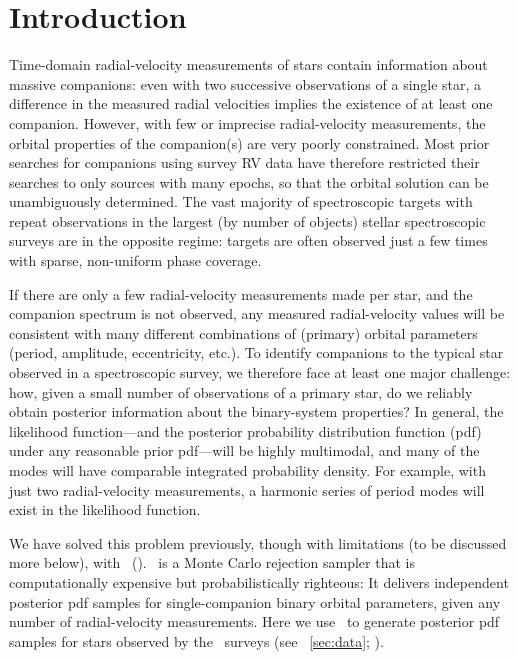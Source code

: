 \documentclass[modern, letterpaper]{aastex61}
\newcommand{\apogee}{\project{\acronym{APOGEE}}}
\newcommand{\thejoker}{\project{The~Joker}}
\begin{document}

\section{Introduction} \label{sec:intro}

Time-domain radial-velocity measurements of stars contain information about
massive companions: even with two successive observations of a single star, a
difference in the measured radial velocities implies the existence of at least
one companion.
However, with few or imprecise radial-velocity measurements, the orbital
properties of the companion(s) are very poorly constrained.
Most prior searches for companions using survey RV data have therefore
restricted their searches to only sources with many epochs, so that the orbital
solution can be unambiguously determined.
The vast majority of spectroscopic targets with repeat observations in the
largest (by number of objects) stellar spectroscopic surveys are in the opposite
regime: targets are often observed just a few times with sparse, non-uniform
phase coverage.


If there are only a few radial-velocity measurements made per star, and the
companion spectrum is not observed, any measured radial-velocity values will be
consistent with many different combinations of (primary) orbital parameters
(period, amplitude, eccentricity, etc.).
To identify companions to the typical star observed in a spectroscopic survey,
we therefore face at least one major challenge: how, given a small number of
observations of a primary star, do we reliably obtain posterior information
about the binary-system properties?
In general, the likelihood function---and the posterior probability distribution
function (pdf) under any reasonable prior pdf---will be highly multimodal, and
many of the modes will have comparable integrated probability density.
For example, with just two radial-velocity measurements, a harmonic series of
period modes will exist in the likelihood function.

We have solved this problem previously, though with limitations (to be discussed
more below), with \thejoker\ (\citealt{Price-Whelan:2017}).
\thejoker\ is a Monte Carlo rejection sampler that is computationally expensive
but probabilistically righteous:
It delivers independent posterior pdf samples for single-companion binary
orbital parameters, given any number of radial-velocity measurements.
Here we use \thejoker\ to generate posterior pdf samples for  stars
observed by the \apogee\ surveys (see \sectionname~\ref{sec:data};
\citealt{Majewski:2015}).
\end{document}
